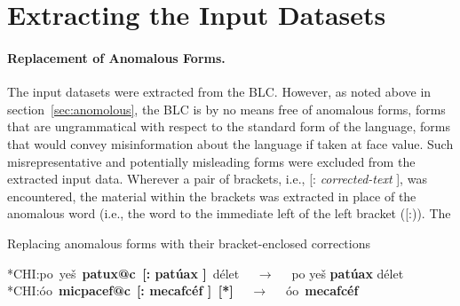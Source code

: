 \section{Extracting the Input Datasets}\label{sec:extr}
\paragraph{Replacement of Anomalous Forms.} 
The input datasets were extracted from the \ac{BLC}. However, as noted above in 
section~\ref{sec:anomolous}, the \ac{BLC} is by no means free of anomalous forms, 
forms that are ungrammatical with respect to the standard form of the language, 
forms that would convey misinformation about the language if taken at face value. 
Such misrepresentative and potentially misleading forms were excluded from the 
extracted input data. 
Wherever a pair of brackets, i.e., \textsf{[: \textit{corrected-text} ]}, was encountered, 
the material within the brackets was extracted in place of the anomalous word (i.e., the 
word to the immediate left of the left bracket (\textsf{[:})). The 


\begin{exe}\label{ex:replace}
	\ex Replacing anomalous forms with their bracket-enclosed corrections
	\begin{xlist}
	   \ex \textsf{*\ac{CH}I:}\quad\textsf{po\, ye\v{s}\, \textbf{patux@c\, [: pat\'{u}ax ]}\, d\'{e}let} $\quad\to\quad$
	   \textsf{po ye\v{s} \textbf{pat\'{u}ax} d\'{e}let}
	   \ex \textsf{*\ac{CH}I:}\quad\textsf{\textglotstop\'{o}o\, \textbf{micpacef@c}\, \textbf{[: mecafc\'ef ]\, [*]}} $\quad\to\quad$ \textsf{\textglotstop\'oo\, \textbf{mecafc\'ef}}
	\end{xlist}
\end{exe} 

